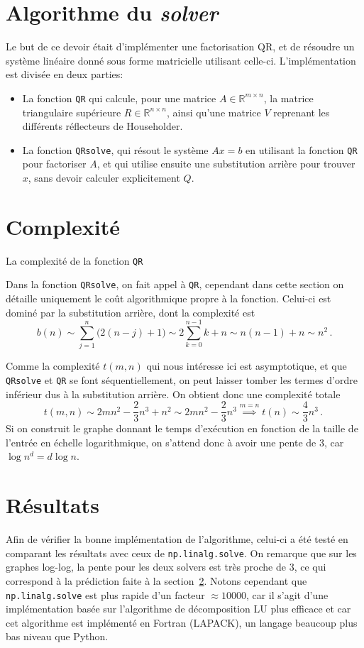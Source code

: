 \documentclass[11pt]{article}
\begin{document}
\section{Algorithme du \emph{solver}}
Le but de ce devoir était d'implémenter une factorisation QR, et de résoudre un système linéaire donné sous forme matricielle utilisant celle-ci.
L'implémentation est divisée en deux parties:
\begin{itemize}
	\item La fonction \texttt{QR} qui calcule, pour une matrice $A \in \mathbb{R}^{m \times n}$, la matrice triangulaire supérieure $R \in \mathbb{R}^{n \times n}$, ainsi qu'une matrice $V$ reprenant les différents réflecteurs de Householder.
	\item La fonction \texttt{QRsolve}, qui résout le système $Ax = b$ en utilisant la fonction \texttt{QR} pour factoriser $A$, et qui utilise ensuite une substitution arrière pour trouver $x$, sans devoir calculer explicitement $Q$. 
\end{itemize}

\section{Complexité}
\label{sec:complexity}
 La complexité de la fonction \texttt{QR} %

 Dans la fonction \texttt{QRsolve}, on fait appel à \texttt{QR},
cependant dans cette section on détaille uniquement le coût algorithmique propre à la fonction.
Celui-ci est dominé par la substitution arrière,
dont la complexité est
\[
b(n) \sim \sum_{j=1}^{n} \big(2(n - j) + 1 \big) \sim 2 \sum_{k=0}^{n-1} k + n \sim n (n - 1) + n \sim n^2\,.
\]

 Comme la complexité $t(m, n)$ qui nous intéresse ici est asymptotique,
et que \texttt{QRsolve} et \texttt{QR} se font séquentiellement,
on peut laisser tomber les termes d'ordre inférieur dus à la substitution arrière.
On obtient donc une complexité totale
\[
t(m, n) \sim 2 mn^2 - \frac{2}{3}n^3 + n^2 \sim 2mn^2 - \frac{2}{3}n^3 \overset{m = n}{\implies} t(n) \sim \frac{4}{3} n^3\,.\ 
\]
Si on construit le graphe donnant le temps d'exécution en fonction de la taille de l'entrée en échelle logarithmique,
on s'attend donc à avoir une pente de $3$, car $\log n^d = d \log n$.
\section{Résultats}
Afin de vérifier la bonne implémentation de l'algorithme,
celui-ci a été testé en comparant les résultats avec ceux de \texttt{np.linalg.solve}.
On remarque que sur les graphes log-log,
la pente pour les deux solvers est très proche de $3$,
ce qui correspond à la prédiction faite à la section~\ref{sec:complexity}.
Notons cependant que \texttt{np.linalg.solve} est plus rapide d'un facteur $\approx \num{10000}$,
car il s'agit d'une implémentation basée sur l'algorithme de décomposition LU plus efficace
et car cet algorithme est implémenté en Fortran (LAPACK), un langage beaucoup plus bas niveau que Python.
\end{document}
